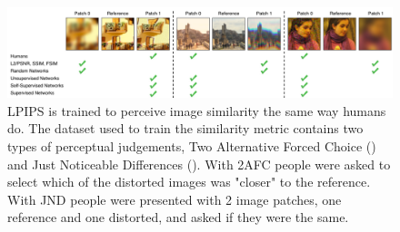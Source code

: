 \begin{figure}[h]
    \label{fig:lpips}
    \centering
    \includegraphics[width=1.0\textwidth]{figures/lpips.png}
    \caption{LPIPS is trained to perceive image similarity the same way humans do. The dataset used to train the similarity metric contains two types of perceptual judgements, Two Alternative Forced Choice () and Just Noticeable Differences (). With 2AFC people were asked to select which of the distorted images was "closer" to the reference. With JND people were presented with 2 image patches, one reference and one distorted, and asked if they were the same.}
    \label{fig:my_label}
\end{figure}